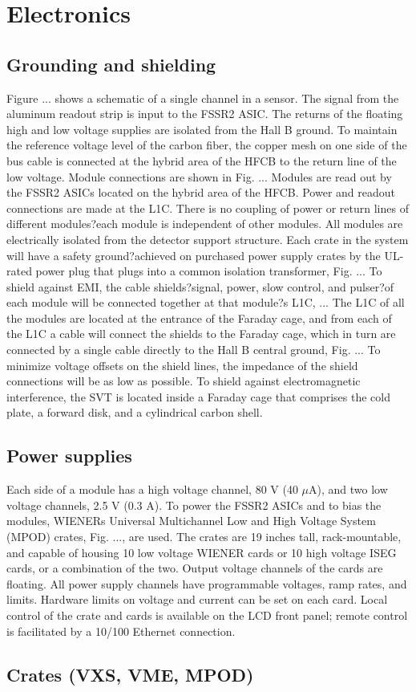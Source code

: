 \section{Electronics}

\subsection{Grounding and shielding}

Figure ... shows a schematic of a single channel in a sensor. The signal from the aluminum readout strip is input to the FSSR2 ASIC. The returns of the floating high and low voltage supplies are isolated from the Hall B ground. To maintain the reference voltage level of the carbon fiber, the copper mesh on one side of the bus cable is connected at the hybrid area of the HFCB to the return line of the low voltage. Module connections are shown in Fig. ... Modules are read out by the FSSR2 ASICs located on the hybrid area of the HFCB. Power and readout connections are made at the L1C. There is no coupling of power or return lines of different modules?each module is independent of other modules. All modules are electrically isolated from the detector support structure. 
Each crate in the system will have a safety ground?achieved on purchased power supply crates by the UL-rated power plug that plugs into a common isolation transformer, Fig. ... To shield against EMI, the cable shields?signal, power, slow control, and pulser?of each module will be connected together at that module?s L1C, ... The L1C of all the modules are located at the entrance of the Faraday cage, and from each of the L1C a cable will connect the shields to the Faraday cage, which in turn are connected by a single cable directly to the Hall B central ground, Fig. ... To minimize voltage offsets on the shield lines, the impedance of the shield connections will be as low as possible. To shield against electromagnetic interference, the SVT is located inside a Faraday cage that comprises the cold plate, a forward disk, and a cylindrical carbon shell.

\subsection{Power supplies}

Each side of a module has a high voltage channel, 80 V (40 $\mu$A), and two low voltage channels, 2.5 V (0.3 A). To power the FSSR2 ASICs and to bias the modules, WIENERs Universal Multichannel Low and High Voltage System (MPOD) crates, Fig. ..., are used. The crates are 19 inches tall, rack-mountable, and capable of housing 10 low voltage WIENER cards or 10 high voltage ISEG cards, or a combination of the two. Output voltage channels of the cards are floating. All power supply channels have programmable voltages, ramp rates, and limits. Hardware limits on voltage and current can be set on each card. Local control of the crate and cards is available on the LCD front panel; remote control is facilitated by a 10/100 Ethernet connection.

\subsection{Crates (VXS, VME, MPOD)}
